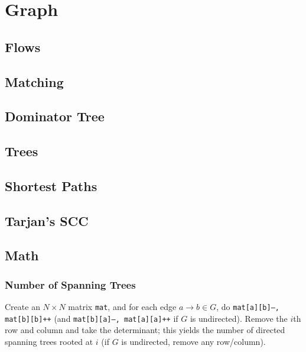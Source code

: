\chapter{Graph}

\section{Flows}

\section{Matching}

\section{Dominator Tree}

\section{Trees}

\section{Shortest Paths}
	
\section{Tarjan's SCC}

\section{Math}
	\subsection{Number of Spanning Trees}
		Create an $N\times N$ matrix \texttt{mat}, and for each edge $a \rightarrow b \in G$, do
		\texttt{mat[a][b]--, mat[b][b]++} (and \texttt{mat[b][a]--, mat[a][a]++} if $G$ is undirected).
		Remove the $i$th row and column and take the determinant; this yields the number of directed spanning trees rooted at $i$
		(if $G$ is undirected, remove any row/column).

